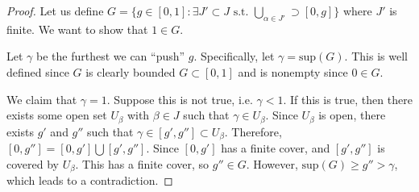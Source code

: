 \begin{itemize}
\begin{theorem}
\begin{proof}
            Let us define $G=\{g\in [0,1]:\exists J' \subset J \text{ s.t. } \bigcup_{\alpha\in J'} \supset [0,g]\}$ where $J'$ is finite. We want to show that $1\in G.$
            \vspace{2mm}

            Let $\gamma$ be the furthest we can ``push'' $g$. Specifically, let $\gamma = \text{sup} (G)$. This is well defined since $G$ is clearly bounded $G \subset [0,1]$ and is nonempty since $0\in G.$
            \vspace{2mm}

            We claim that $\gamma = 1$. Suppose this is not true, i.e. $\gamma < 1$. If this is true, then there exists some open set $U_\beta$ with $\beta \in J$ such that $\gamma \in U_\beta.$ Since $U_\beta$ is open, there exists $g'$ and $g''$ such that $\gamma \in [g',g''] \subset U_\beta.$ Therefore, $[0,g''] = [0,g']\bigcup [g',g''].$ Since $[0,g']$ has a finite cover, and $[g',g'']$ is covered by $U_\beta$. This has a finite cover, so $g'' \in G$. However, $\text{sup}(G) \ge g'' > \gamma$, which leads to a contradiction. 
        \end{proof}
    \end{theorem}
\end{itemize}